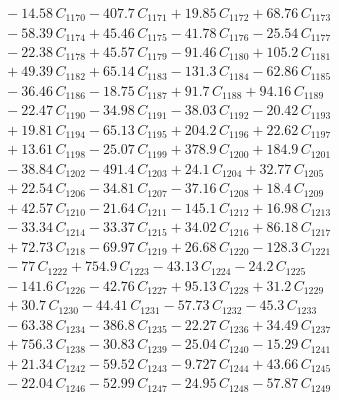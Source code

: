 \documentclass[a4paper,11pt]{article}
\begin{document}
\begin{align}
&\quad - 14.58\,C_{1170} - 407.7\,C_{1171} + 19.85\,C_{1172} + 68.76\,C_{1173} \nonumber\\
&\quad - 58.39\,C_{1174} + 45.46\,C_{1175} - 41.78\,C_{1176} - 25.54\,C_{1177} \nonumber\\
&\quad - 22.38\,C_{1178} + 45.57\,C_{1179} - 91.46\,C_{1180} + 105.2\,C_{1181} \nonumber\\
&\quad + 49.39\,C_{1182} + 65.14\,C_{1183} - 131.3\,C_{1184} - 62.86\,C_{1185} \nonumber\\
&\quad - 36.46\,C_{1186} - 18.75\,C_{1187} + 91.7\,C_{1188} + 94.16\,C_{1189} \nonumber\\
&\quad - 22.47\,C_{1190} - 34.98\,C_{1191} - 38.03\,C_{1192} - 20.42\,C_{1193} \nonumber\\
&\quad + 19.81\,C_{1194} - 65.13\,C_{1195} + 204.2\,C_{1196} + 22.62\,C_{1197} \nonumber\\
&\quad + 13.61\,C_{1198} - 25.07\,C_{1199} + 378.9\,C_{1200} + 184.9\,C_{1201} \nonumber\\
&\quad - 38.84\,C_{1202} - 491.4\,C_{1203} + 24.1\,C_{1204} + 32.77\,C_{1205} \nonumber\\
&\quad + 22.54\,C_{1206} - 34.81\,C_{1207} - 37.16\,C_{1208} + 18.4\,C_{1209} \nonumber\\
&\quad + 42.57\,C_{1210} - 21.64\,C_{1211} - 145.1\,C_{1212} + 16.98\,C_{1213} \nonumber\\
&\quad - 33.34\,C_{1214} - 33.37\,C_{1215} + 34.02\,C_{1216} + 86.18\,C_{1217} \nonumber\\
&\quad + 72.73\,C_{1218} - 69.97\,C_{1219} + 26.68\,C_{1220} - 128.3\,C_{1221} \nonumber\\
&\quad - 77\,C_{1222} + 754.9\,C_{1223} - 43.13\,C_{1224} - 24.2\,C_{1225} \nonumber\\
&\quad - 141.6\,C_{1226} - 42.76\,C_{1227} + 95.13\,C_{1228} + 31.2\,C_{1229} \nonumber\\
&\quad + 30.7\,C_{1230} - 44.41\,C_{1231} - 57.73\,C_{1232} - 45.3\,C_{1233} \nonumber\\
&\quad - 63.38\,C_{1234} - 386.8\,C_{1235} - 22.27\,C_{1236} + 34.49\,C_{1237} \nonumber\\
&\quad + 756.3\,C_{1238} - 30.83\,C_{1239} - 25.04\,C_{1240} - 15.29\,C_{1241} \nonumber\\
&\quad + 21.34\,C_{1242} - 59.52\,C_{1243} - 9.727\,C_{1244} + 43.66\,C_{1245} \nonumber\\
&\quad - 22.04\,C_{1246} - 52.99\,C_{1247} - 24.95\,C_{1248} - 57.87\,C_{1249} \nonumber\\

\end{align}
\end{document}
